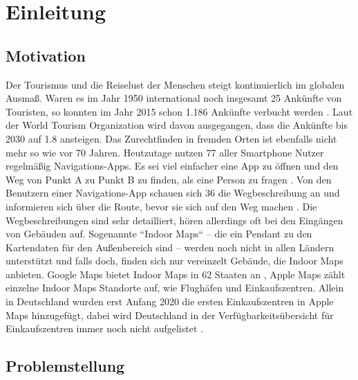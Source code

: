 \chapter{Einleitung}

\section{Motivation}
Der Tourismus und die Reiselust der Menschen steigt kontinuierlich im globalen Ausmaß. Waren es im Jahr 1950 international noch insgesamt \SI{25}{\mio} Ankünfte von Touristen, so konnten im Jahr 2015 schon \SI{1.186}{\mrd} Ankünfte verbucht werden \parencite{GLA2017}. Laut der World Tourism Organization wird davon ausgegangen, dass die Ankünfte bis 2030 auf \SI{1.8}{\mrd} ansteigen. Das Zurechtfinden in fremden Orten ist ebenfalls nicht mehr so wie vor 70 Jahren. Heutzutage nutzen \SI{77}{\prc} aller Smartphone Nutzer regelmäßig Navigations-Apps. Es sei viel einfacher eine App zu öffnen und den Weg von Punkt A zu Punkt B zu finden, als eine Person zu fragen \parencite{PAN2018}.%
%
Von den Benutzern einer Navigations-App schauen sich \SI{36}{\prc} die Wegbeschreibung an und informieren sich über die Route, bevor sie sich auf den Weg machen \parencite{PAN2018}. Die Wegbeschreibungen sind sehr detailliert, hören allerdings oft bei den Eingängen von Gebäuden auf. Sogenannte ``Indoor Maps`` – die ein Pendant zu den Kartendaten für den Außenbereich sind – werden noch nicht in allen Ländern unterstützt und falls doch, finden sich nur vereinzelt Gebäude, die Indoor Maps anbieten. Google Maps bietet Indoor Maps in 62 Staaten an \parencite{GOO2020}, Apple Maps zählt einzelne Indoor Maps Standorte auf, wie Flughäfen und Einkaufszentren. Allein in Deutschland wurden erst Anfang 2020 die ersten Einkaufszentren in Apple Maps hinzugefügt, dabei wird Deutschland in der Verfügbarkeitsübersicht für Einkaufszentren immer noch nicht aufgelistet \parencite{OES2020}.%
%
\section{Problemstellung}

